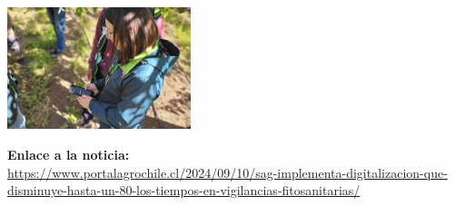 \documentclass{article}
\begin{document}
    \begin{flushright}
    \includegraphics[width=0.4\textwidth]{SAG-implementa-digitalizacion-que-disminuye-hasta-un-80-los-tiempos-en-vigilancias-fitosanitarias-696x464.jpg}
    \end{flushright}

    \vspace{10mm}

    \noindent
    \textbf{Enlace a la noticia:} \\
    \href{https://www.portalagrochile.cl/2024/09/10/sag-implementa-digitalizacion-que-disminuye-hasta-un-80-los-tiempos-en-vigilancias-fitosanitarias/}{https://www.portalagrochile.cl/2024/09/10/sag-implementa-digitalizacion-que-disminuye-hasta-un-80-los-tiempos-en-vigilancias-fitosanitarias/}

    
\end{document}
